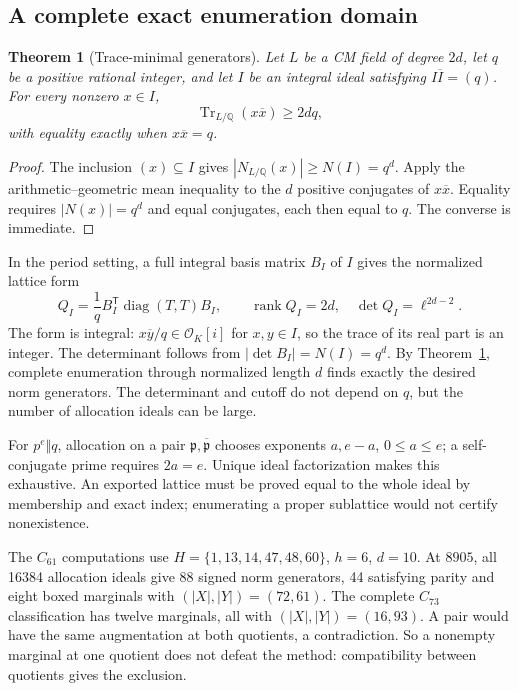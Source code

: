 \documentclass[11pt]{article}
\newtheorem{theorem}{Theorem}[section]
\theoremstyle{definition}
\theoremstyle{remark}
\begin{document}
\subsection{A complete exact enumeration domain}
\begin{theorem}[Trace-minimal generators]\label{thm:trace-minimal}
Let $L$ be a CM field of degree $2d$, let $q$ be a positive rational integer,
and let $I$ be an integral ideal satisfying $I\overline I=(q)$. For every
nonzero $x\in I$,
\[
 \operatorname{Tr}_{L/\mathbb Q}(x\overline x)\ge2dq,
\]
with equality exactly when $x\overline x=q$.
\end{theorem}
\begin{proof}
The inclusion $(x)\subseteq I$ gives $|N_{L/\mathbb Q}(x)|\ge N(I)=q^d$.
Apply the arithmetic--geometric mean inequality to the $d$ positive
conjugates of $x\overline x$. Equality requires $|N(x)|=q^d$ and equal
conjugates, each then equal to $q$. The converse is immediate.
\end{proof}
In the period setting, a full integral basis matrix $B_I$ of $I$ gives the
normalized lattice form
\[
 Q_I=\frac1q B_I^{\mathsf T}\operatorname{diag}(T,T)B_I,
 \qquad \operatorname{rank}Q_I=2d,\quad
 \det Q_I=\ell^{2d-2}.
\]
The form is integral: $x\overline y/q\in\mathcal O_K[i]$ for $x,y\in I$,
so the trace of its real part is an integer. The determinant follows from
$|\det B_I|=N(I)=q^d$. By Theorem~\ref{thm:trace-minimal}, complete
enumeration through normalized length $d$ finds exactly the desired norm
generators. The determinant and cutoff do not depend on $q$, but the number
of allocation ideals can be large.

For $p^e\Vert q$, allocation on a pair $\mathfrak p,\overline{\mathfrak p}$
chooses exponents $a,e-a$, $0\le a\le e$; a self-conjugate prime requires
$2a=e$. Unique ideal factorization makes this exhaustive. An exported
lattice must be proved equal to the whole ideal by membership and exact
index; enumerating a proper sublattice would not certify nonexistence.

The $C_{61}$ computations use $H=\{1,13,14,47,48,60\}$, $h=6$, $d=10$. At
$8905$, all 16384 allocation ideals give 88 signed norm generators, 44
satisfying parity and eight boxed marginals with $(|X|,|Y|)=(72,61)$. The
complete $C_{73}$ classification has twelve marginals, all with
$(|X|,|Y|)=(16,93)$. A pair would have the same augmentation at both
quotients, a contradiction. So a nonempty marginal at one quotient does not
defeat the method: compatibility between quotients gives the exclusion.
\end{document}
